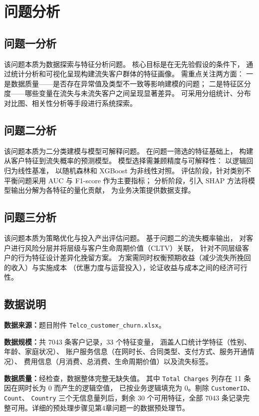 \section{问题分析}


\subsection{问题一分析}

该问题本质为数据探索与特征分析问题。
核心目标是在无先验假设的条件下，
通过统计分析和可视化呈现构建流失客户群体的特征画像。
需重点关注两方面：
一是数据质量——是否存在异常值及类型不一致等影响建模的问题；
二是特征区分度——哪些变量在流失与未流失客户之间呈现显著差异。
可采用分组统计、分布对比图、相关性分析等手段进行系统探索。

\subsection{问题二分析}

该问题本质为二分类建模与模型可解释问题。
在问题一筛选的特征基础上，
构建从客户特征到流失概率的预测模型。
模型选择需兼顾精度与可解释性：
以逻辑回归为线性基准，
以随机森林和 XGBoost 为非线性对照。
评估阶段，针对类别不平衡问题采用 AUC 与 F1-score 作为主要指标；
分析阶段，引入 SHAP 方法将模型输出分解为各特征的量化贡献，
为业务决策提供数据支撑。

\subsection{问题三分析}

该问题本质为策略优化与投入产出评估问题。
基于问题二的流失概率输出，
对客户进行风险分层并将层级与客户生命周期价值（CLTV）关联，
针对不同层级客户的行为特征设计差异化挽留方案。
方案需同时权衡预期收益（减少流失所挽回的收入）与实施成本
（优惠力度与运营投入），论证收益与成本之间的经济可行性。

\subsection{数据说明}

\textbf{数据来源：}题目附件 \texttt{Telco\_customer\_churn.xlsx}。

\textbf{数据规模：}共 7043 条客户记录，33 个特征变量，
涵盖人口统计学特征（性别、年龄、家庭状况）、
账户服务信息（在网时长、合同类型、支付方式、服务开通情况）、
费用信息（月消费、总消费、生命周期价值）以及流失标签。

\textbf{数据质量：}经检查，数据整体完整无缺失值。
其中 \texttt{Total Charges} 列存在 11 条因在网时长为 0 而产生的逻辑空值，
已按业务逻辑填充为 0。剔除 \texttt{CustomerID}、\texttt{Count}、
\texttt{Country} 三个无信息量列后，剩余 30 个可用特征，全部 7043 条记录完整可用。详细的预处理步骤见第4章问题一的数据预处理节。


